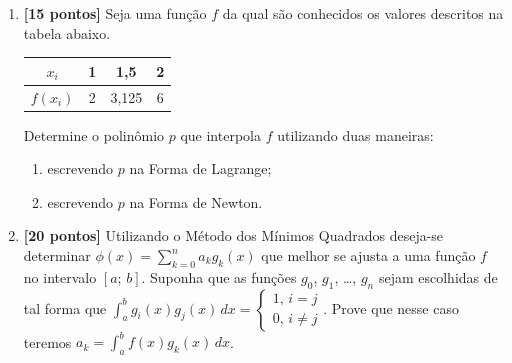 \documentclass[10pt,a4paper]{article}
\begin{document}
\begin{enumerate}
 \item \textbf{[15 pontos]} Seja uma função $f$ da qual são conhecidos os valores descritos na tabela abaixo.
  \begin{center}
   \begin{tabular}{c|c|c|c}
    $x_i$ & 1 & 1,5 & 2\\ \hline
    $f(x_i)$ & 2 & 3,125 & 6
   \end{tabular}
  \end{center}

  Determine o polinômio $p$ que interpola $f$ utilizando duas maneiras:
  \begin{enumerate}
   \item escrevendo $p$ na Forma de Lagrange;
   \item escrevendo $p$ na Forma de Newton.
  \end{enumerate}

 \item \textbf{[20 pontos]} Utilizando o Método dos Mínimos Quadrados deseja-se determinar $\displaystyle \phi(x) = \sum_{k=0}^n a_kg_k(x)$ que melhor se ajusta 
a uma função $f$ no intervalo $[a;\, b]$. Suponha que as funções $g_0$, $g_1$, \ldots, $g_n$ sejam escolhidas de tal forma que 
$\displaystyle\int_a^b g_i(x)g_j(x)\,dx = \begin{cases}1,\,i = j \\ 0,\,i\neq j\end{cases}$. Prove que nesse caso teremos 
$a_k = \displaystyle\int_a^b f(x)g_k(x)\,dx$.

\end{enumerate}
\end{document}

